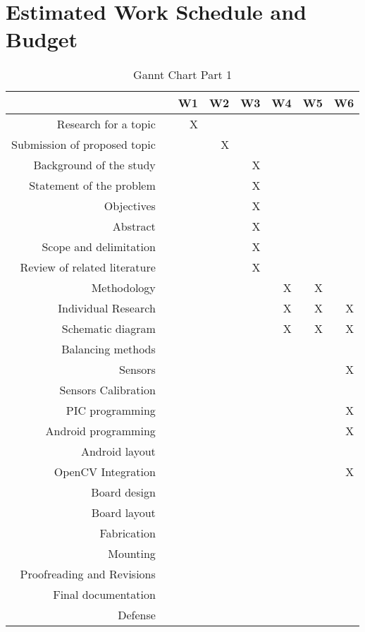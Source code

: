 \section{Estimated Work Schedule and Budget}
\begin{table}[htbp]
  \centering
  \caption{Gannt Chart Part 1}
    \begin{tabular}{rrrrrrrr}
    \toprule
      &   &       W1 &       W2 &       W3 &       W4 &       W5 &       W6 \\
    \midrule
    Research for a topic &   & X &   &   &   &   &  \\
    Submission of proposed topic &   &   & X &   &   &   &  \\
    Background of the study &   &   &   & X &   &   &  \\
    Statement of the problem &   &   &   & X &   &   &  \\
    Objectives &   &   &   & X &   &   &  \\
    Abstract &   &   &   & X &   &   &  \\
    Scope and delimitation &   &   &   & X &   &   &  \\
    Review of related literature &   &   &   & X &   &   &  \\
    Methodology &   &   &   &   & X & X &  \\
    Individual Research &   &   &   &   & X & X & X \\
    Schematic diagram &   &   &   &   & X & X & X \\
    Balancing methods &   &   &   &   &   &   &  \\
    Sensors &   &   &   &   &   &   & X \\
    Sensors Calibration &   &   &   &   &   &   &  \\
    PIC programming &   &   &   &   &   &   & X \\
    Android programming &   &   &   &   &   &   & X \\
    Android layout &   &   &   &   &   &   &  \\
    OpenCV Integration &   &   &   &   &   &   & X \\
    Board design &   &   &   &   &   &   &  \\
    Board layout &   &   &   &   &   &   &  \\
    Fabrication &   &   &   &   &   &   &  \\
    Mounting &   &   &   &   &   &   &  \\
    Proofreading and Revisions &   &   &   &   &   &   &  \\
    Final documentation &   &   &   &   &   &   &  \\
    Defense &   &   &   &   &   &   &  \\
    \bottomrule
    \end{tabular}%
  \label{tab:addlabel}%
\end{table}%




